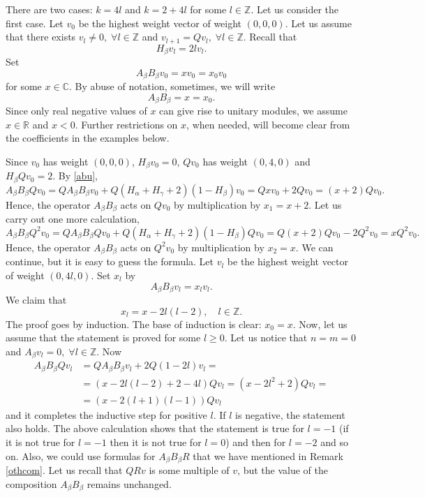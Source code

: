 \documentclass[twoside,a4paper,12pt]{article}
\newcommand{\C}{\ensuremath{\mathbb C}}
\newcommand{\Z}{\ensuremath{\mathbb Z}}
\theoremstyle{definition}
\begin{document}
There are two cases: $k=4l$ and $k=2+4l$ for some $l\in\Z$. Let us consider
the first case. Let $v_0$ be the highest weight vector of weight $(0,0,0)$.
Let us assume that there exists $v_l\neq0,\;\forall l\in\Z$ and
$v_{l+1}=Qv_l,\;\forall l\in\Z$. Recall that
\begin{equation*}
	H_\beta v_l=2l v_l.
\end{equation*}
Set
\begin{equation}\label{xdef}
	A_\beta B_\beta v_0=xv_0=x_0v_0
\end{equation}
for some $x\in\C$. By abuse of notation, sometimes, we will write
\begin{equation*}
	A_\beta B_\beta=x=x_0.
\end{equation*}
Since only real negative values of $x$ can give rise to unitary modules, we
assume $x\in\mathbb R$ and $x<0$. Further restrictions on $x$, when needed, will
become clear from the coefficients in the examples below.

Since $v_0$ has weight $(0,0,0)$, $H_\beta v_0=0$, $Qv_0$ has weight $(0,4,0)$
and $H_\beta Qv_0=2$. By \eqref{abu},
\begin{equation*}
	A_\beta B_\beta Qv_0=QA_\beta B_\beta v_0+
	Q(H_\alpha+H_\gamma+2)(1-H_\beta)v_0=Qxv_0+2Qv_0=(x+2)Qv_0.
\end{equation*}
Hence, the operator $A_\beta B_\beta$ acts on $Qv_0$ by multiplication by
$x_1=x+2$. Let us carry out one more calculation,
\begin{equation*}
	A_\beta B_\beta Q^2v_0=
	QA_\beta B_\beta Qv_0+Q(H_\alpha+H_\gamma+2)(1-H_\beta)Qv_0=
	Q(x+2)Qv_0-2Q^2v_0=xQ^2v_0.
\end{equation*}
Hence, the operator $A_\beta B_\beta$ acts on $Q^2v_0$ by multiplication by
$x_2=x$. We can continue, but it is easy to guess the formula. Let $v_l$
be the highest weight vector of weight $(0,4l,0)$. Set $x_l$ by
\begin{equation}\label{ab}
	A_\beta B_\beta v_l=x_lv_l.
\end{equation}
We claim that
\begin{equation}\label{xldef}
	x_l=x-2l(l-2),\quad l\in\Z.
\end{equation}
The proof goes by induction. The base of induction is clear: $x_0=x$.
Now, let us assume that the statement is proved for some $l\geq0$. Let us
notice that $n=m=0$ and $A_\beta v_l=0,\;\forall l\in\Z$. Now
\begin{align*}
	A_\beta B_\beta Qv_l&=QA_\beta B_\beta v_l+2Q(1-2l)v_l=\\
	&=(x-2l(l-2)+2-4l)Qv_l=(x-2l^2+2)Qv_l=\\
	&=(x-2(l+1)(l-1))Qv_l
\end{align*}
and it completes the inductive step for positive $l$. If $l$ is negative,
the statement also holds. The above calculation shows that the statement is
true for $l=-1$ (if it is not true for $l=-1$ then it is not true for $l=0$)
and then for $l=-2$ and so on. Also, we could use formulas for
$A_\beta B_\beta R$ that we have mentioned in Remark \ref{othcom}. Let us
recall that $QRv$ is some multiple of $v$, but the value of the composition
$A_\beta B_\beta$ remains unchanged.
\end{document}
